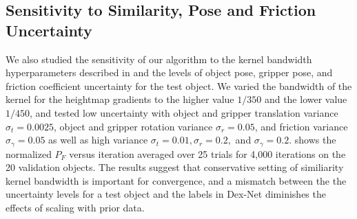 \subsection{Sensitivity to Similarity, Pose and Friction Uncertainty}
We also studied the sensitivity of our algorithm to the kernel bandwidth hyperparameters described in  and the levels of object pose, gripper pose, and friction coefficient uncertainty for the test object.
We varied the bandwidth of the kernel for the heightmap gradients to the higher value $1 / 350$ and the lower value $1 / 450$, and tested low uncertainty with object and gripper translation variance $\sigma_{t} = 0.0025$, object and gripper rotation variance $\sigma_{r} = 0.05$, and friction variance $\sigma_{\gamma} = 0.05$ as well as high variance $\sigma_{t} = 0.01, \sigma_{r} = 0.2,$ and $\sigma_{\gamma} = 0.2$.
 shows the normalized $P_F$ versus iteration averaged over 25 trials for 4,000 iterations on the 20 validation objects.
The results suggest that conservative setting of similiarity kernel bandwidth is important for convergence, and a mismatch between the the uncertainty levels for a test object and the labels in Dex-Net diminishes the effects of scaling with prior data. 

